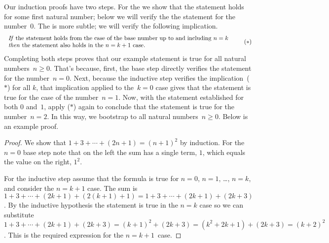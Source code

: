 \documentclass{ibl}  %
\begin{document}
Our induction proofs have two steps.
For the  
we show that the statement holds for some first natural number;
below we will verify the the statement for the number~$0$.
The  is more subtle;
we will verify the following implication.
\begin{equation*}
  \begin{tabular}{l} 
  \textit{If} the statement holds from the case of the 
   base number up to and including~$n=k$ \\
  \textit{then} the statement also holds in the~$n=k+1$ case.
  \end{tabular}
  \tag{$*$}
\end{equation*}
Completing both steps proves that our example statement is true for all natural
numbers~$n\geq 0$.
That's because, first, the base step
directly verifies the statement for the number~$n=0$.
Next, because the inductive step verifies the implication~($*$) for all $k$, 
that implication applied to the~$k=0$ case gives 
that the statement is true for the case of the number~$n=1$. 
Now, with the statement established for both $0$ and~$1$, 
apply ($*$) again to conclude that the statement is true for the number~$n=2$.
In this way, we bootstrap to all natural numbers~$n\geq 0$.
Below is an example proof.

\begin{proof}
  We show that $1+3+\cdots+(2n+1)=(n+1)^2$ by induction.
  For the $n=0$ base step note that on the left the sum has a single term, $1$,
  which equals the value on the right, $1^2$.

  For the inductive step assume that the 
  formula is true for $n=0$, $n=1$, \ldots, $n=k$, and 
  consider the $n=k+1$ case.
  The sum is $1+3+\cdots+(2k+1)+(2(k+1)+1)=1+3+\cdots+(2k+1)+(2k+3)$.
  By the inductive hypothesis the statement is true in the $n=k$ case
  so we can substitute 
  $1+3+\cdots+(2k+1)+(2k+3)=(k+1)^2+(2k+3)=(k^2+2k+1)+(2k+3)=(k+2)^2$.
  This is the required expression for the $n=k+1$~case.
\end{proof}
\end{document}
